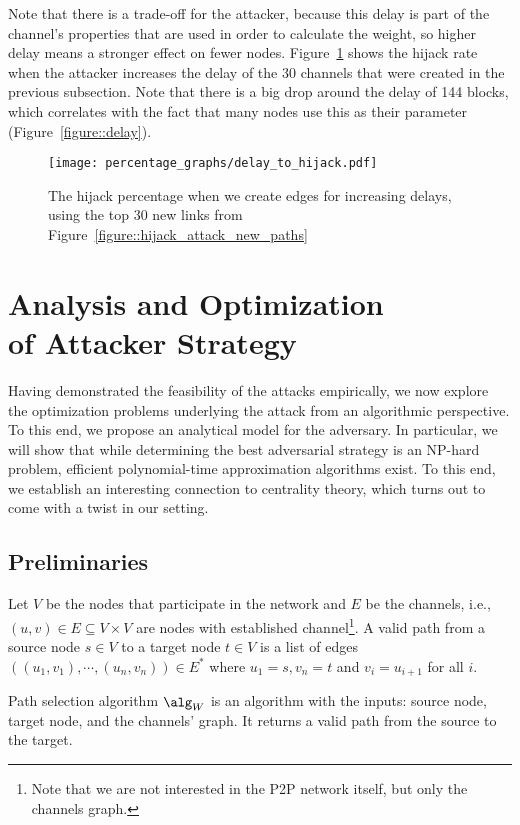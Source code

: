 Note that there is a trade-off for the attacker, because this delay is part of the channel's properties that are used in order to calculate the weight, so higher delay means a stronger effect on fewer nodes. Figure~\ref{figure::delay_attack} shows the hijack rate when the attacker increases the delay of the 30 channels that were created in the previous subsection. Note that there is a big drop around the delay of 144 blocks, which correlates with the fact that many nodes use this as their parameter (Figure~\ref{figure::delay}). 

\begin{figure} 
	\centering
	\texttt{[image: percentage\_graphs/delay\_to\_hijack.pdf]}
	\caption{The hijack percentage when we create edges for increasing delays, using the top 30 new links from Figure~\ref{figure::hijack_attack_new_paths}}
	\label{figure::delay_attack}
\end{figure}
    
\section{Analysis and Optimization\\of Attacker Strategy}\label{sec:preliminaries}

Having demonstrated the feasibility of the attacks empirically,
we now explore the optimization problems  underlying the attack
from an algorithmic perspective. To this end, we propose
an analytical model for the adversary.
In particular, we will show that while determining the best adversarial
strategy is an NP-hard problem, efficient polynomial-time approximation
algorithms exist. To this end, we establish an interesting connection
to centrality theory, which turns out to come with a twist in our setting.

\subsection{Preliminaries}

Let $V$ be the nodes that participate in the network and $E$ be the channels, 
i.e., $(u,v) \in E \subseteq V \times V$ are nodes with established channel\footnote{Note that we 
are not interested in the P2P network itself, but only the channels graph.}. 
A valid path from a source node $s \in V$ to a target node $t \in V$ is a list of edges $((u_1, v_1), \cdots, (u_n, v_n)) \in E^*$ where $u_1 = s, v_n = t$ and $v_i = u_{i+1}$ for all $i$. 

Path selection algorithm $\alg_W$ is an algorithm with the inputs: source node, target node, and the channels' graph.
It returns a valid path from the source to the target. 


